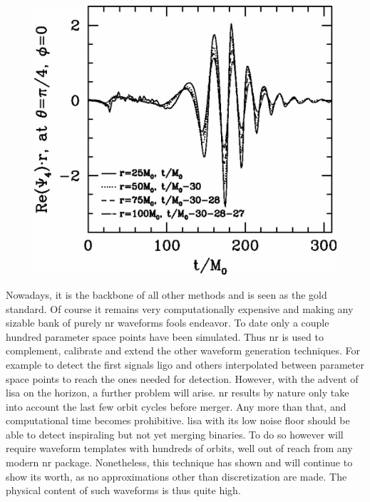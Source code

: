 \documentclass[
  10pt,
  a4paper,
  DIV=11,
  numbers=noendperiod,
  oneside]{scrreprt}
\DeclareRobustCommand{\[}{\begin{equation}}
\DeclareRobustCommand{\]}{\end{equation}}
\begin{document}
\begin{figure}


{\centering \includegraphics{./pretwave.png}

}

\end{figure}

Nowadays, it is the backbone of all other methods and is seen as the
gold standard. Of course it remains very computationally expensive and
making any sizable bank of purely \gls{nr} waveforms fools endeavor. To
date only a couple hundred parameter space points have been simulated.
Thus \gls{nr} is used to complement, calibrate and extend the other
waveform generation techniques. For example to detect the first signals
\gls{ligo} and others interpolated between parameter space points to
reach the ones needed for detection. However, with the advent of
\gls{lisa} on the horizon, a further problem will arise. \gls{nr}
results by nature only take into account the last few orbit cycles
before merger. Any more than that, and computational time becomes
prohibitive. \gls{lisa} with its low noise floor should be able to
detect inspiraling but not yet merging binaries. To do so however will
require waveform templates with hundreds of orbits, well out of reach
from any modern \gls{nr} package. Nonetheless, this technique has shown
and will continue to show its worth, as no approximations other than
discretization are made. The physical content of such waveforms is thus
quite high.
\end{document}

